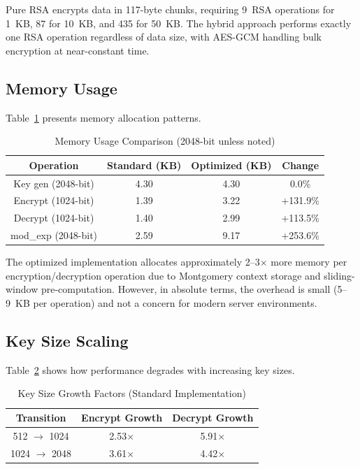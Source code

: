 \documentclass[journal]{IEEEtran}
\begin{document}
Pure RSA encrypts data in 117-byte chunks, requiring 9~RSA operations for 1~KB, 87 for 10~KB, and 435 for 50~KB. The hybrid approach performs exactly one RSA operation regardless of data size, with AES-GCM handling bulk encryption at near-constant time.

\subsection{Memory Usage}

Table~\ref{tab:memory} presents memory allocation patterns.

\begin{table}[!t]
\caption{Memory Usage Comparison (2048-bit unless noted)}
\label{tab:memory}
\centering
\begin{tabular}{|c|c|c|c|}
\hline
\textbf{Operation} & \textbf{Standard (KB)} & \textbf{Optimized (KB)} & \textbf{Change} \\
\hline
Key gen (2048-bit) & 4.30 & 4.30 & 0.0\% \\
\hline
Encrypt (1024-bit) & 1.39 & 3.22 & +131.9\% \\
\hline
Decrypt (1024-bit) & 1.40 & 2.99 & +113.5\% \\
\hline
mod\_exp (2048-bit) & 2.59 & 9.17 & +253.6\% \\
\hline
\end{tabular}
\end{table}

The optimized implementation allocates approximately 2--3$\times$ more memory per encryption/decryption operation due to Montgomery context storage and sliding-window pre-computation. However, in absolute terms, the overhead is small (5--9~KB per operation) and not a concern for modern server environments.

\subsection{Key Size Scaling}

Table~\ref{tab:scaling} shows how performance degrades with increasing key sizes.

\begin{table}[!t]
\caption{Key Size Growth Factors (Standard Implementation)}
\label{tab:scaling}
\centering
\begin{tabular}{|c|c|c|}
\hline
\textbf{Transition} & \textbf{Encrypt Growth} & \textbf{Decrypt Growth} \\
\hline
512 $\rightarrow$ 1024 & 2.53$\times$ & 5.91$\times$ \\
\hline
1024 $\rightarrow$ 2048 & 3.61$\times$ & 4.42$\times$ \\
\hline
\end{tabular}
\end{table}
\end{document}
